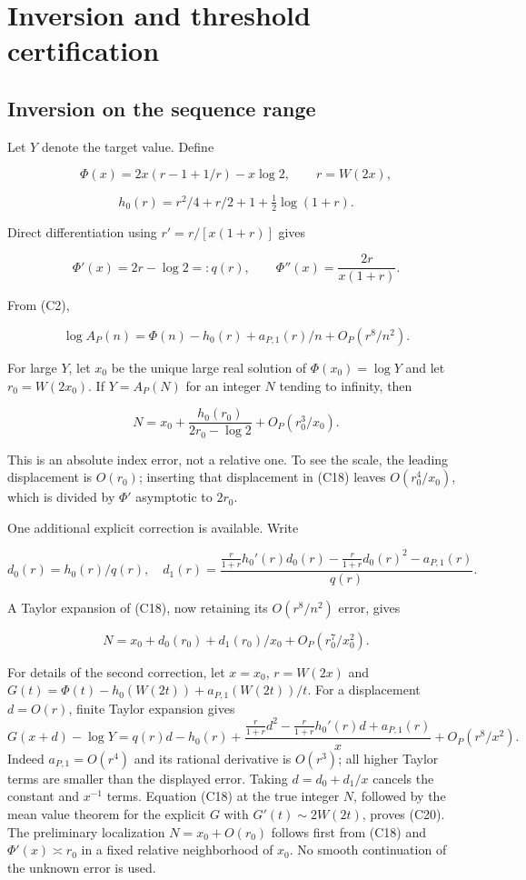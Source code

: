 \section{Inversion and threshold
certification}\label{tcl:inversion-and-threshold-certification}

\subsection{Inversion on the sequence
range}\label{tcl:inversion-on-the-sequence-range}

Let \(Y\) denote the target value. Define

\[
 \Phi(x)=2x(r-1+1/r)-x\log2,
 \qquad r=W(2x),
\]

\[
 h_0(r)=r^2/4+r/2+1+\tfrac12\log(1+r).
\]

Direct differentiation using \(r'=r/[x(1+r)]\) gives

\[
 \Phi'(x)=2r-\log2=:q(r),\qquad
 \Phi''(x)=\frac{2r}{x(1+r)}.
 \tag{C17}\label{tcl:eq:C17}
\]

From (C2),

\[
 \log A_P(n)=\Phi(n)-h_0(r)+a_{P,1}(r)/n+O_{P}(r^8/n^2).
 \tag{C18}\label{tcl:eq:C18}
\]

For large \(Y\), let \(x_0\) be the unique large real solution of
\(\Phi(x_0)=\log Y\) and let \(r_0=W(2x_0)\). If \(Y=A_P(N)\) for an
integer \(N\) tending to infinity, then

\[
 N=x_0+\frac{h_0(r_0)}{2r_0-\log2}
 +O_P(r_0^3/x_0).
 \tag{C19}\label{tcl:eq:C19}
\]

This is an absolute index error, not a relative one. To see the scale,
the leading displacement is \(O(r_0)\); inserting that displacement in
(C18) leaves \(O(r_0^4/x_0)\), which is divided by \(\Phi'\) asymptotic
to \(2r_0\).

One additional explicit correction is available. Write

\[
 d_0(r)=h_0(r)/q(r),\quad
 d_1(r)=\frac{\frac r{1+r}h_0'(r)d_0(r)
 -\frac r{1+r}d_0(r)^2-a_{P,1}(r)}{q(r)}.
\]

A Taylor expansion of (C18), now retaining its \(O(r^8/n^2)\) error,
gives

\[
 N=x_0+d_0(r_0)+d_1(r_0)/x_0+O_P(r_0^7/x_0^2).
 \tag{C20}\label{tcl:eq:C20}
\]

For details of the second correction, let $x=x_0$, $r=W(2x)$ and
$G(t)=\Phi(t)-h_0(W(2t))+a_{P,1}(W(2t))/t$.
For a displacement $d=O(r)$, finite Taylor expansion gives
\[
G(x+d)-\log Y=q(r)d-h_0(r)
 +\frac{\frac r{1+r}d^2-\frac r{1+r}h_0'(r)d+a_{P,1}(r)}{x}
 +O_P(r^8/x^2).
\]
Indeed $a_{P,1}=O(r^4)$ and its rational derivative is $O(r^3)$;
all higher Taylor terms are smaller than the displayed error.
Taking $d=d_0+d_1/x$ cancels the constant and $x^{-1}$ terms.
Equation (C18) at the true integer $N$, followed by the mean value theorem
for the explicit $G$ with $G'(t)\sim2W(2t)$, proves (C20).
The preliminary localization $N=x_0+O(r_0)$ follows first from (C18)
and $\Phi'(x)\asymp r_0$ in a fixed relative neighborhood of $x_0$.
No smooth continuation of the unknown error is used.

